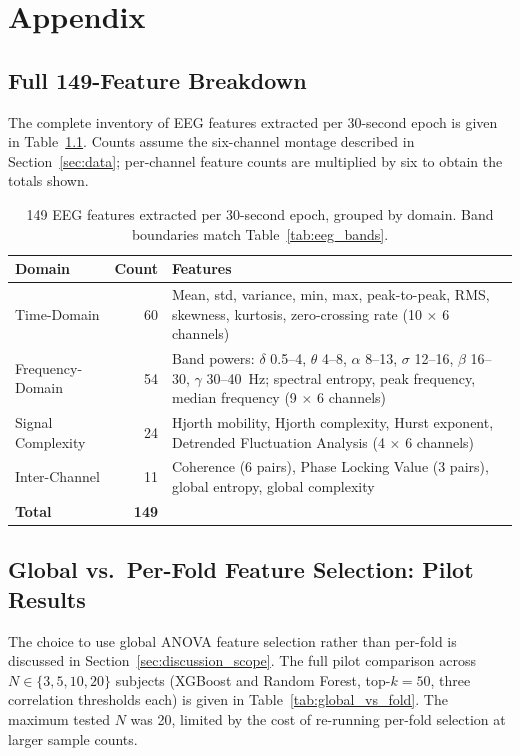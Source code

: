 \chapter{Appendix}
\label{chap:appendix}

\section{Full 149-Feature Breakdown}
\label{sec:appendix_features}

The complete inventory of EEG features extracted per 30-second epoch is given
in Table~\ref{tab:feature_breakdown_149}. Counts assume the six-channel
montage described in Section~\ref{sec:data}; per-channel feature counts are
multiplied by six to obtain the totals shown.

\begin{table}[ht]
\centering
\caption[149-feature breakdown by domain]{149 EEG features extracted per
30-second epoch, grouped by domain. Band boundaries match
Table~\ref{tab:eeg_bands}.}
\label{tab:feature_breakdown_149}
\begin{tabular}{p{3.2cm}rp{7.5cm}}
\toprule
\textbf{Domain} & \textbf{Count} & \textbf{Features} \\
\midrule
Time-Domain & 60 & Mean, std, variance, min, max, peak-to-peak, RMS,
 skewness, kurtosis, zero-crossing rate
 (10 $\times$ 6 channels) \\[4pt]
Frequency-Domain & 54 & Band powers: $\delta$ 0.5--4, $\theta$ 4--8,
 $\alpha$ 8--13, $\sigma$ 12--16, $\beta$ 16--30,
 $\gamma$ 30--40~Hz; spectral entropy, peak frequency,
 median frequency (9 $\times$ 6 channels) \\[4pt]
Signal Complexity & 24 & Hjorth mobility, Hjorth complexity, Hurst exponent,
 Detrended Fluctuation Analysis
 (4 $\times$ 6 channels) \\[4pt]
Inter-Channel & 11 & Coherence (6 pairs), Phase Locking Value (3 pairs),
 global entropy, global complexity \\
\midrule
\textbf{Total} & \textbf{149} & \\
\bottomrule
\end{tabular}
\end{table}

\section{Global vs.\ Per-Fold Feature Selection: Pilot Results}
\label{sec:appendix_global_vs_fold}

The choice to use global ANOVA feature selection rather than per-fold is
discussed in Section~\ref{sec:discussion_scope}. The full pilot comparison
across $N \in \{3,5,10,20\}$ subjects (XGBoost and Random Forest, top-$k=50$,
three correlation thresholds each) is given in
Table~\ref{tab:global_vs_fold}. The maximum tested $N$ was 20, limited by
the cost of re-running per-fold selection at larger sample counts.


